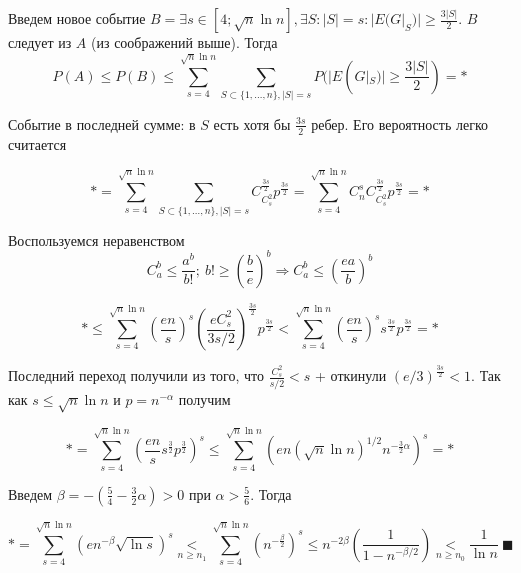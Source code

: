 \par Введем новое событие $B = \exists s \in [4; \sqrt{n} \ln{n}], \exists S: |S|=s: |E(G|_S)|\geq \frac{3|S|}{2}$. $B$ следует из $A$ (из соображений выше). Тогда $$P(A) \leq P(B) \leq \sum_{s=4}^{\sqrt{n}\ln{n}} \sum_{S \subset \{1, \ldots, n\}, |S|=s} P(|E(G|_S)|\geq \frac{3|S|}{2})=*$$

\par Событие в последней сумме: в $S$ есть хотя бы $\frac{3s}{2}$ ребер. Его вероятность легко считается

$$*=\sum_{s=4}^{\sqrt{n}\ln{n}} \sum_{S \subset \{1, \ldots, n\}, |S|=s} C_{C_s^2}^{\frac{3s}{2}} p^{\frac{3s}{2}}=\sum_{s=4}^{\sqrt{n}\ln{n}} C_n^s C_{C_s^2}^{\frac{3s}{2}} p^{\frac{3s}{2}}=*$$

\par Воспользуемся неравенством $$C_a^b \leq \frac{a^b}{b!}; \: b! \geq \left(\frac{b}{e}\right)^b \Rightarrow C_a^b \leq \left(\frac{ea}{b}\right)^b$$

$$* \leq \sum_{s=4}^{\sqrt{n}\ln{n}} \left(\frac{en}{s}\right)^s \left(\frac{eC_s^2}{3s/2}\right)^{\frac{3s}{2}} p^{\frac{3s}{2}} < \sum_{s=4}^{\sqrt{n}\ln{n}} \left(\frac{en}{s}\right)^s s^{\frac{3s}{2}} p^{\frac{3s}{2}} = *$$

\par Последний переход получили из того, что $\frac{C_s^2}{s/2} < s$ + откинули $(e/3)^{\frac{3s}{2}} < 1$. Так как $s \leq \sqrt{n}\ln{n}$ и $p=n^{-\alpha}$ получим

$$*=\sum_{s=4}^{\sqrt{n}\ln{n}} \left(\frac{en}{s}s^{\frac{3}{2}}p^{\frac{3}{2}}\right)^s \leq \sum_{s=4}^{\sqrt{n}\ln{n}} \left( en (\sqrt{n}\ln{n})^{1/2} n^{-\frac{3}{2}\alpha}\right)^s=*$$

\par Введем $\beta = -\left(\frac{5}{4}-\frac{3}{2}\alpha\right) > 0$ при $\alpha > \frac{5}{6}$. Тогда

$$*=\sum_{s=4}^{\sqrt{n}\ln{n}} (en^{-\beta}\sqrt{\ln{s}})^s \underset{n \geq n_1}{<} \sum_{s=4}^{\sqrt{n}\ln{n}} (n^{-\frac{\beta}{2}})^s \leq n^{-2\beta} \left(\frac{1}{1-n^{-\beta/2}}\right) \underset{n \geq n_0}{<} \frac{1}{\ln{n}} \: \blacksquare$$


